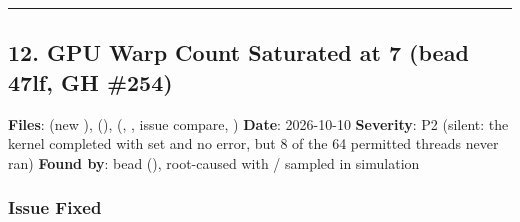 \begin{record}
\begin{center}\rule{0.5\linewidth}{0.5pt}\end{center}

\end{record}

\subsection{12. GPU Warp Count Saturated at 7 (bead 47lf, GH \#254)}\label{cr:fix:fixes-index:12-gpu-warp-count-saturated-at-7-bead-47lf-gh-254}

\begin{record}

\textbf{Files}:  (new ),
 (),
 (,
, issue compare, ) \textbf{Date}:
2026-10-10 \textbf{Severity}: P2 (silent: the kernel completed with
 set and no error, but 8 of the 64 permitted threads
never ran) \textbf{Found by}: bead  (),
root-caused with  /  sampled in
simulation

\end{record}

\subsubsection{Issue Fixed}\label{cr:fix:fixes-index:issue-fixed-5}

